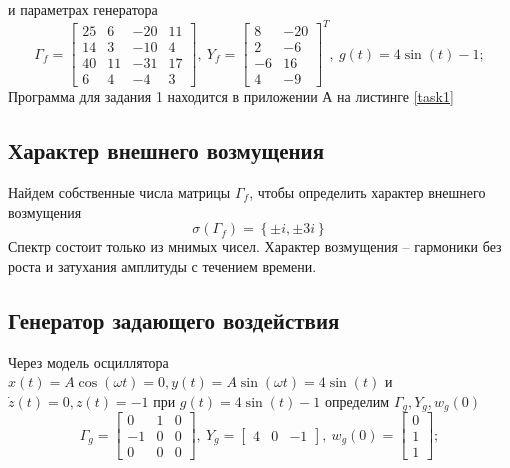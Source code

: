 \documentclass[a4paper, 12pt]{article}
\begin{document}
    и параметрах генератора
    $$
    \Gamma_f=\begin{bmatrix}
        25 &6 &-20 &11\\
        14 &3 &-10 &4\\
        40 &11 &-31 &17\\
        6 &4 &-4 &3
    \end{bmatrix},\ Y_f=\begin{bmatrix}
        8 &-20\\
        2 &-6\\
        -6 &16\\
        4 &-9
    \end{bmatrix}^T,\ g(t)=4\sin\left( t \right)-1;
    $$
    Программа для задания 1 находится в приложении А на листинге \ref{task1}


    \subsection{Характер внешнего возмущения}
    Найдем собственные числа матрицы $\Gamma_f$,
    чтобы определить характер внешнего возмущения
    $$
    \sigma\left( \Gamma_f \right)=\left\{ \pm i,\pm3i \right\}
    $$
    Спектр состоит только из мнимых чисел. Характер возмущения --
    гармоники без роста и затухания амплитуды с течением времени.


    \subsection{Генератор задающего воздействия}
    Через модель осциллятора
    $x(t)=A\cos\left(\omega t \right)=0,y(t)=A\sin\left( \omega t \right)=4\sin\left( t \right)$ и $\dot{z}(t)=0,z(t)=-1$
    при $g(t)=4\sin\left( t \right)-1$ определим $\Gamma_g,Y_g,w_g(0)$
    $$
    \Gamma_g=\begin{bmatrix}
        0 &1 &0\\
        -1 &0 &0\\
        0 &0 &0
    \end{bmatrix},\ Y_g=\begin{bmatrix}
        4 &0 &-1
    \end{bmatrix},\ w_g(0)=\begin{bmatrix}
        0\\1\\1
    \end{bmatrix};
    $$
\end{document}
